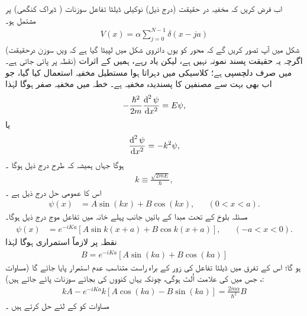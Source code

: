 اب فرض کریں کہ مخفیہ در حقیقت (درج ذیل)  نوکیلی ڈیلٹا تفاعل سوزنات ( ڈیراک کنگھی)  پر مشتمل ہو۔
\begin{align}\label{مساوات_متماثل_کنگھی}
	V(x) = \alpha\sum_{j=0}^{N-1}\delta(x-ja)
\end{align}
(شکل   میں آپ تصور کریں گے  کہ محور  کو یوں دائروی شکل میں  لپیٹا  گیا ہے کہ ویں  سوزن  درحقیقت نقطہ   پر پائی  جاتی ہے۔)  اگرچہ یہ حقیقت پسند نمونہ نہیں ہے، لیکن یاد رہے،  ہمیں  کے اثرات  میں صرف  دلچسپی ہے؛  کلاسیکی   میں   دہراتا  ہوا مستطیل مخفیہ استعمال کیا گیا،  جو اب بھی بہت سے مصنفین کا پسندیدہ مخفیہ ہے۔  خطہ  میں مخفیہ صفر ہوگا لہٰذا 
\begin{align*}
	-\frac{\hslash^{2}}{2m}\frac{\dif^{\,2}\psi}{\dif x^{2}} = E\psi,
\end{align*}
یا
\begin{align*}
	\frac{\dif^{\,2}\psi}{\dif x^{2}} = -k^{2}\psi,
\end{align*}
ہوگا جہاں ہمیشہ کہ طرح درج ذیل ہوگا ۔
\begin{align}
	k \equiv  \frac{\sqrt{2mE}}{\hslash},
\end{align}
اس کا عمومی حل درج ذیل ہے ۔
\begin{align}\label{مساوات_متماثل_عمومی_حل_بلوخ_الف}
	\psi(x) &= A\sin(kx) + B\cos(kx), &&(0<x<a).
\end{align}
مسئلہ بلوخ کے تحت مبدا کے بائیں جانب  پہلے خانہ میں تفاعل موج درج ذیل ہوگا۔ 
\begin{align}\label{مساوات_متماثل_عمومی_حل_بلوخ_ب}
	\psi(x) &= e^{-iKa}[A\sin k(x+a) + B\cos k(x+a)], &&(-a<x<0). 
\end{align}
نقطہ پر  لازماً استمراری ہوگا لہٰذا 
\begin{align}\label{مساوات_متماثل_استمراری_بلوخ}
	B = e^{-iKa}[A\sin(ka) + B\cos(ka)]
\end{align}
ہو گا؛ اس کے تفرق میں ڈیلٹا تفاعل کی زور کے براہ راست متناسب عدم استمرار پایا  جائے گا  (مساوات ،   جس میں  کی علامت اُلٹ ہوگی،  چونکہ یہاں کنووں  کی بجائے  سوزنات  پائے  جاتے ہیں):
\begin{align}\label{مساوات_متماثل_عدم_استمرار_بلوخ}
	kA - e^{-iKa}k[A\cos(ka) - B\sin(ka)] = \frac{2m\alpha}{\hslash^{2}}B
\end{align}
مساوات  کو  کے لئے حل کرتے ہیں ۔
